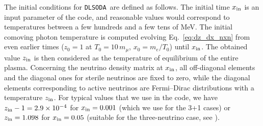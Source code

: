 \documentclass[notitlepage,showpacs,preprintnumbers,amsmath,amssymb,superscriptaddress,prd,onecolumn]{revtex4-1}
\newcommand{\e}[1]{\ensuremath{\times10^{#1}}}
\newcommand{\dlsoda}{\texttt{DLSODA}}
\begin{document}
The initial conditions for \dlsoda\ are defined as follows.
The initial time $x_{\rm in}$ is an input parameter of the code,
and reasonable values would correspond to temperatures between a few hundreds and a few tens of MeV.
The initial comoving photon temperature is computed evolving Eq.~\eqref{eq:dz_dx_nxn}
from even earlier times ($z_0=1$ at $T_0=10\, m_\mu$, $x_0=m_e/T_0$) until $x_{\rm in}$.
The obtained value $z_{\rm in}$ is then considered as the temperature of equilibrium
of the entire plasma. Concerning the neutrino density matrix at $x_{\rm in}$, all off-diagonal elements and the diagonal ones for sterile
neutrinos are fixed to zero, while the diagonal elements corresponding to active neutrinos are 
Fermi--Dirac distributions with a temperature $z_{\rm in}$.
For typical values that we use in the code,
we have $z_{\rm in}-1=2.9\e{-4}$ for $x_{\rm in}=0.001$ (which we use for the 3+1 cases)
or
$z_{\rm in} = 1.098$ for $x_{\rm in}=0.05$ (suitable for the three-neutrino case, see \cite{deSalas:2016ztq}).
\end{document}
